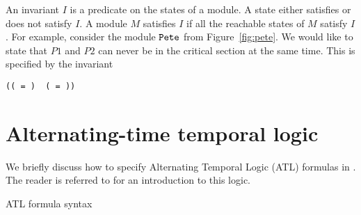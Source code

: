 \mypar
An invariant $I$ is a predicate on the states of a module.
A state either satisfies  or does not satisfy $I$. A module
$M$ satisfies $I$ if all the reachable states of $M$ satisfy $I$.
For example, consider the module $\mbox{\tt Pete}$ from Figure~\ref{fig:pete}.
We would like to state that $P1$ and $P2$ can never be in the 
critical section at the same time. This is specified by the invariant

\begin{center}
\tt \NOT((\statuso\ = \incs) \AND\ (\statust\ = \incs))
\end{center}

\section{Alternating-time temporal logic}

We briefly discuss how to specify Alternating Temporal Logic
(ATL)
formulas in \mocha.  The reader is referred to \cite{AHK97} for an
introduction to this logic.

\begin{table}
\caption{ATL formula syntax}
\label{table-atl-syntax}
\end{table}

